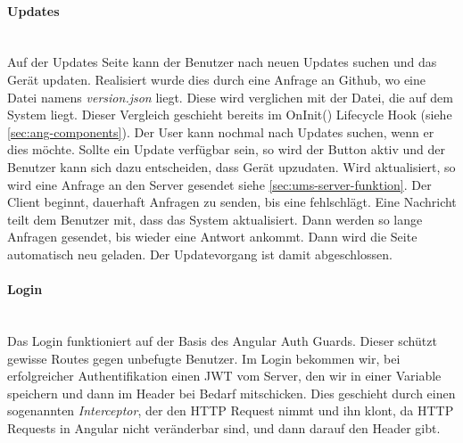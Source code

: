 \paragraph*{Updates}\mbox{}\\
Auf der Updates Seite kann der Benutzer nach neuen Updates suchen und das Gerät updaten. Realisiert wurde dies durch eine Anfrage an Github, wo eine Datei namens \textit{version.json} liegt. Diese wird verglichen mit der Datei, die auf dem System liegt. Dieser Vergleich geschieht bereits im OnInit() Lifecycle Hook (siehe \ref{sec:ang-components}). Der User kann nochmal nach Updates suchen, wenn er dies möchte. Sollte ein Update verfügbar sein, so wird der Button aktiv und der Benutzer kann sich dazu entscheiden, dass Gerät upzudaten. Wird aktualisiert, so wird eine Anfrage an den Server gesendet siehe \ref{sec:ums-server-funktion}. Der Client beginnt, dauerhaft Anfragen zu senden, bis eine fehlschlägt. Eine Nachricht teilt dem Benutzer mit, dass das System aktualisiert. Dann werden so lange Anfragen gesendet, bis wieder eine Antwort ankommt. Dann wird die Seite automatisch neu geladen. Der Updatevorgang ist damit abgeschlossen.

\paragraph*{Login}\mbox{}\\
Das Login funktioniert auf der Basis des Angular Auth Guards. Dieser schützt gewisse Routes gegen unbefugte Benutzer. Im Login bekommen wir, bei erfolgreicher Authentifikation einen \ac{JWT} vom Server, den wir in einer Variable speichern und dann im  Header bei Bedarf mitschicken. Dies geschieht durch einen sogenannten \textit{Interceptor}, der den \ac{HTTP} Request nimmt und ihn klont, da \ac{HTTP} Requests in Angular nicht veränderbar sind, und dann darauf den  Header gibt.

